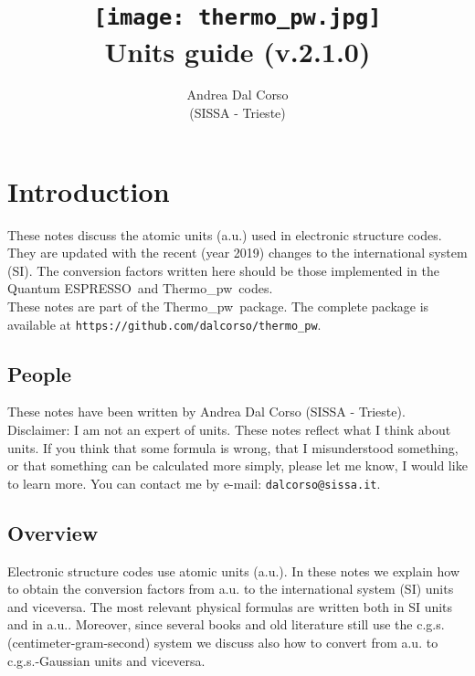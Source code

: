 \documentclass[12pt,a4paper,twoside]{report}
\def\version{2.1.0}
\def\qe{{\sc Quantum ESPRESSO}}
\def\tpw{{\sc Thermo}\_{\sc pw}}
\begin{document}
 

\author{Andrea Dal Corso \\ (SISSA - Trieste)}
\date{}

\title{
  \texttt{[image: thermo\_pw.jpg]} \\
  \vspace{3truecm}
  \Huge \color{dark-blue} Units guide (v.\version)
}

\maketitle

\newpage

\color{dark-blue}
\tableofcontents
\color{black}

\newpage

{\color{dark-blue}\chapter{Introduction}}
\color{black}

These notes discuss the atomic units (a.u.) used in 
electronic structure codes. They are updated with the recent 
(year 2019) changes to the international system (SI).  
The conversion factors written here should be those implemented in
the \qe\ and \tpw\ codes. \\
These notes are part of the \tpw\ package. The complete package is
available at \texttt{https://github.com/dalcorso/thermo\_pw}.

\newpage
{\color{coral}\section{People}}
\color{black}
These notes have been written by Andrea Dal Corso (SISSA - Trieste). \\
Disclaimer: I am not an expert of units. 
These notes reflect what I think about units.
If you think that some formula is wrong, that I misunderstood something, or 
that something can be calculated more simply, please let me know, I would 
like to learn more. 
You can contact me by e-mail: \texttt{dalcorso@sissa.it}. 

\newpage
{\color{coral}\section{Overview}}
\color{black}
Electronic structure codes use atomic units (a.u.). 
In these notes we explain how to obtain the conversion factors 
from a.u. to the international system (SI) units and viceversa. 
The most relevant physical formulas are written both in SI units 
and in a.u.. Moreover, since several books and old literature still 
use the c.g.s. (centimeter-gram-second) system we discuss also how 
to convert from a.u. to c.g.s.-Gaussian units and viceversa.
\end{document}
